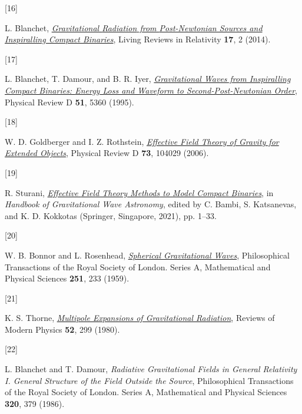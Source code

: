 \documentclass[
  10pt,
  a4paper,
  DIV=11,
  numbers=noendperiod,
  oneside]{scrreprt}
\newlength{\cslhangindent}
\newlength{\csllabelwidth}
\newlength{\cslentryspacingunit} %
\newenvironment{CSLReferences}[2] %
 {%
  \setlength{\parindent}{0pt}
  \ifodd #1
  \let\oldpar\par
  \def\par{\hangindent=\cslhangindent\oldpar}
  \fi
  \setlength{\parskip}{#2\cslentryspacingunit}
 }%
 {}
\newcommand{\CSLLeftMargin}[1]{\parbox[t]{\csllabelwidth}{#1}}
\newcommand{\CSLRightInline}[1]{\parbox[t]{\linewidth - \csllabelwidth}{#1}\break}
\DeclareRobustCommand{\[}{\begin{equation}}
\DeclareRobustCommand{\]}{\end{equation}}
\begin{document}
\begin{CSLReferences}{0}{0}
\leavevmode{}%
\CSLLeftMargin{{[}16{]} }%
\CSLRightInline{L. Blanchet,
\emph{\href{https://doi.org/10.12942/lrr-2014-2}{Gravitational
{Radiation} from {Post-Newtonian Sources} and {Inspiralling Compact
Binaries}}}, Living Reviews in Relativity \textbf{17}, 2 (2014).}

\leavevmode{}%
\CSLLeftMargin{{[}17{]} }%
\CSLRightInline{L. Blanchet, T. Damour, and B. R. Iyer,
\emph{\href{https://doi.org/10.1103/PhysRevD.51.5360}{Gravitational
Waves from Inspiralling Compact Binaries: {Energy} Loss and Waveform to
Second-Post-{Newtonian} Order}}, Physical Review D \textbf{51}, 5360
(1995).}

\leavevmode{}%
\CSLLeftMargin{{[}18{]} }%
\CSLRightInline{W. D. Goldberger and I. Z. Rothstein,
\emph{\href{https://doi.org/10.1103/PhysRevD.73.104029}{Effective Field
Theory of Gravity for Extended Objects}}, Physical Review D \textbf{73},
104029 (2006).}

\leavevmode{}%
\CSLLeftMargin{{[}19{]} }%
\CSLRightInline{R. Sturani,
\emph{\href{https://doi.org/10.1007/978-981-15-4702-7_32-1}{Effective
{Field Theory Methods} to {Model Compact Binaries}}}, in \emph{Handbook
of {Gravitational Wave Astronomy}}, edited by C. Bambi, S. Katsanevas,
and K. D. Kokkotas ({Springer}, {Singapore}, 2021), pp. 1--33.}

\leavevmode{}%
\CSLLeftMargin{{[}20{]} }%
\CSLRightInline{W. B. Bonnor and L. Rosenhead,
\emph{\href{https://doi.org/10.1098/rsta.1959.0003}{Spherical
Gravitational Waves}}, Philosophical Transactions of the Royal Society
of London. Series A, Mathematical and Physical Sciences \textbf{251},
233 (1959).}

\leavevmode{}%
\CSLLeftMargin{{[}21{]} }%
\CSLRightInline{K. S. Thorne,
\emph{\href{https://doi.org/10.1103/RevModPhys.52.299}{Multipole
Expansions of Gravitational Radiation}}, Reviews of Modern Physics
\textbf{52}, 299 (1980).}

\leavevmode{}%
\CSLLeftMargin{{[}22{]} }%
\CSLRightInline{L. Blanchet and T. Damour, \emph{Radiative
{Gravitational Fields} in {General Relativity I}. {General Structure} of
the {Field} Outside the {Source}}, Philosophical Transactions of the
Royal Society of London. Series A, Mathematical and Physical Sciences
\textbf{320}, 379 (1986).}


\end{CSLReferences}
\end{document}
